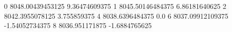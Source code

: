 0 8048.00439453125 9.36474609375
1 8045.50146484375 6.86181640625
2 8042.3955078125 3.755859375
4 8038.6396484375 0.0
6 8037.09912109375 -1.54052734375
8 8036.951171875 -1.6884765625
